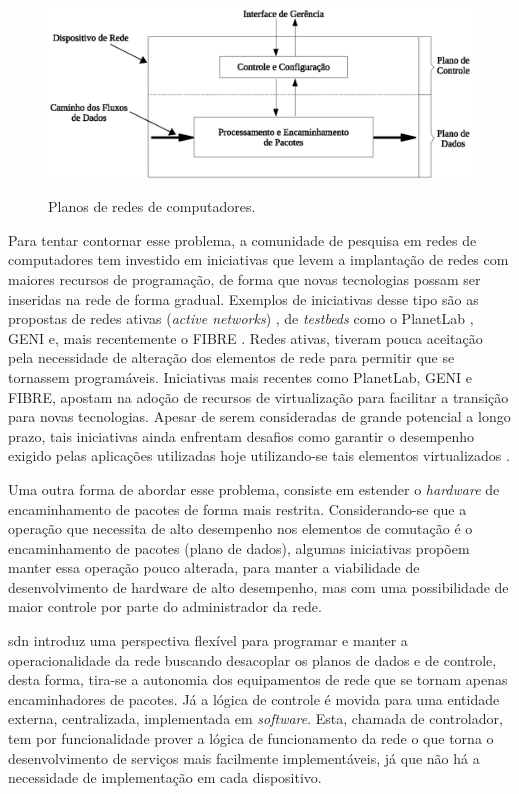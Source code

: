 \begin{figure}[H]
  \centering
  \caption{Planos de redes de computadores.}
  \includegraphics[width=.9\textwidth]{images/planos-introducao.eps}
  \label{fig:planos-introducao}
  
\end{figure}
\FloatBarrier

Para tentar contornar esse problema, a comunidade de pesquisa em redes de computadores tem investido em iniciativas que levem a implantação de redes com maiores recursos de programação, de forma que novas tecnologias possam ser inseridas na rede de forma gradual. Exemplos de iniciativas desse tipo são as propostas de redes ativas (\textit{active networks}) \cite{Tennenhouse:1997}, de \textit{testbeds} como o PlanetLab \cite{Chun:2003}, GENI \cite{Turner:2006} e, mais recentemente o FIBRE \cite{Salmito:2014}. Redes ativas, tiveram pouca aceitação pela necessidade de alteração dos elementos de rede para permitir que se tornassem programáveis. Iniciativas mais recentes como PlanetLab, GENI e FIBRE, apostam na adoção de recursos de virtualização para facilitar a transição para novas tecnologias. Apesar de serem consideradas de grande potencial a longo prazo, tais iniciativas ainda enfrentam desafios como garantir o desempenho exigido pelas aplicações utilizadas hoje utilizando-se tais elementos virtualizados \cite{Guedes:2006}.

Uma outra forma de abordar esse problema, consiste em estender o \textit{hardware} de encaminhamento de pacotes de forma mais restrita. Considerando-se que a operação que necessita de alto desempenho nos elementos de comutação é o encaminhamento de pacotes (plano de dados), algumas iniciativas propõem manter essa operação pouco alterada, para manter a viabilidade de desenvolvimento de hardware de alto desempenho, mas com uma possibilidade de maior controle por parte do administrador da rede. 

\gls{sdn} introduz uma perspectiva flexível para programar e manter a operacionalidade da rede  buscando desacoplar os planos de dados e de controle, desta forma, tira-se a autonomia dos equipamentos de rede que se tornam apenas encaminhadores de pacotes. Já a lógica de controle é movida para uma entidade externa, centralizada, implementada em \textit{software}. Esta, chamada de controlador, tem por funcionalidade prover a lógica de funcionamento da rede o que torna o desenvolvimento de serviços mais facilmente implementáveis, já que não há a necessidade de implementação em cada dispositivo. 

